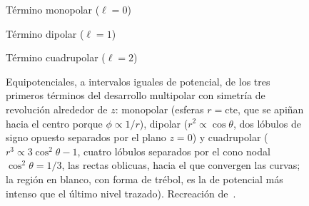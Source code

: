 \begin{figure}[ht]
\centering
\newcommand{\rotulo}[1]{{\footnotesize #1}\\[3pt]}
\renewcommand{\EQ}[1]{\draw[mmaEQsolo] plot coordinates {#1};}
\begin{minipage}[t]{0.325\textwidth}\centering
\rotulo{Término monopolar ($\ell=0$)}
\end{minipage}\hfill
\begin{minipage}[t]{0.325\textwidth}\centering
\rotulo{Término dipolar ($\ell=1$)}
\end{minipage}\hfill
\begin{minipage}[t]{0.325\textwidth}\centering
\rotulo{Término cuadrupolar ($\ell=2$)}
\end{minipage}
\caption{Equipotenciales, a intervalos iguales de potencial, de los tres primeros términos del desarrollo multipolar con simetría de revolución alrededor de $z$:
monopolar (esferas $r=\text{cte}$, que se apiñan hacia el centro porque $\phi\propto1/r$), dipolar ($r^{2}\propto\cos\theta$, dos lóbulos de signo opuesto separados por
el plano $z=0$) y cuadrupolar ($r^{3}\propto3\cos^{2}\theta-1$, cuatro lóbulos separados por el cono nodal $\cos^{2}\theta=1/3$, las rectas oblicuas, hacia el que convergen las curvas; la región en blanco, con forma de trébol, es la de potencial más intenso que el último nivel trazado). Recreación
de~\cite{FIGURAS-T2}.}
\label{fig:equipotenciales}
\end{figure}
